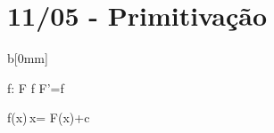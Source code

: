 \part{11/05 - Primitivação}\relax

\begin{sectionBox}b[0mm]{}

\begin{BM}[align*][\Large]
	f:\to{}
\quad
	F  f
\iff	F'=f
\end{BM}\relax

\vspace{-12mm}

\begin{BM}[align*][\Huge]
	\int f(x)\,x= F(x)+c
\end{BM}\relax

\end{sectionBox}



